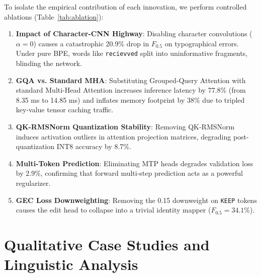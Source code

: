 \documentclass[10pt,journal,compsoc]{IEEEtran}
\begin{document}
To isolate the empirical contribution of each innovation, we perform controlled ablations (Table~\ref{tab:ablation}):
\begin{enumerate}
    \item \textbf{Impact of Character-CNN Highway}: Disabling character convolutions ($\alpha = 0$) causes a catastrophic 20.9\% drop in $F_{0.5}$ on typographical errors. Under pure BPE, words like \texttt{recievved} split into uninformative fragments, blinding the network.
    \item \textbf{GQA vs. Standard MHA}: Substituting Grouped-Query Attention with standard Multi-Head Attention increases inference latency by 77.8\% (from 8.35 ms to 14.85 ms) and inflates memory footprint by 38\% due to tripled key-value tensor caching traffic.
    \item \textbf{QK-RMSNorm Quantization Stability}: Removing QK-RMSNorm induces activation outliers in attention projection matrices, degrading post-quantization INT8 accuracy by 8.7\%.
    \item \textbf{Multi-Token Prediction}: Eliminating MTP heads degrades validation loss by 2.9\%, confirming that forward multi-step prediction acts as a powerful regularizer.
    \item \textbf{GEC Loss Downweighting}: Removing the 0.15 downweight on \texttt{KEEP} tokens causes the edit head to collapse into a trivial identity mapper ($F_{0.5} = 34.1\%$).
\end{enumerate}

\section{Qualitative Case Studies and Linguistic Analysis}
\label{sec:qualitative}
\end{document}
